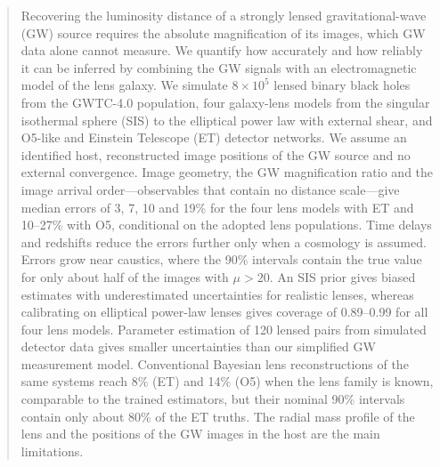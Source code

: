 \begin{abstract}
Recovering the luminosity distance of a strongly lensed gravitational-wave (GW) source requires the absolute magnification of its images, which GW data alone cannot measure. We quantify how accurately and how reliably it can be inferred by combining the GW signals with an electromagnetic model of the lens galaxy. We simulate $8\times10^5$ lensed binary black holes from the GWTC-4.0 population, four galaxy-lens models from the singular isothermal sphere (SIS) to the elliptical power law with external shear, and O5-like and Einstein Telescope (ET) detector networks. We assume an identified host, reconstructed image positions of the GW source and no external convergence. Image geometry, the GW magnification ratio and the image arrival order---observables that contain no distance scale---give median errors of 3, 7, 10 and 19\% for the four lens models with ET and 10--27\% with O5, conditional on the adopted lens populations. Time delays and redshifts reduce the errors further only when a cosmology is assumed. Errors grow near caustics, where the 90\% intervals contain the true value for only about half of the images with $\mu>20$. An SIS prior gives biased estimates with underestimated uncertainties for realistic lenses, whereas calibrating on elliptical power-law lenses gives coverage of 0.89--0.99 for all four lens models. Parameter estimation of 120 lensed pairs from simulated detector data gives smaller uncertainties than our simplified GW measurement model. Conventional Bayesian lens reconstructions of the same systems reach 8\% (ET) and 14\% (O5) when the lens family is known, comparable to the trained estimators, but their nominal 90\% intervals contain only about 80\% of the ET truths. The radial mass profile of the lens and the positions of the GW images in the host are the main limitations.
\end{abstract}
